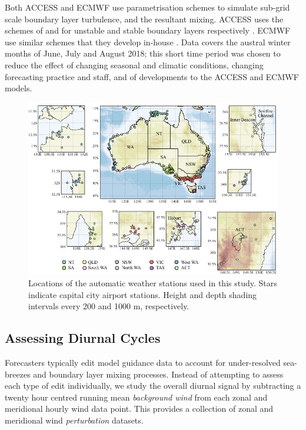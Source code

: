\documentclass{ametsoc}
\begin{document}
Both ACCESS and ECMWF use parametrisation schemes to simulate sub-grid scale boundary layer turbulence, and the resultant mixing. ACCESS uses the schemes of \citet{lock00} and \citet{louis79} for unstable and stable boundary layers respectively \citep{bom10}. ECMWF use similar schemes that they develop in-house \citep{ecmwf18}. Data covers the austral winter months of June, July and August 2018; this short time period was chosen to reduce the effect of changing seasonal and climatic conditions, changing forecasting practice and staff, and of developments to the ACCESS and ECMWF models.

\begin{figure}
\centering
\includegraphics[width=39pc]{map.pdf}
\caption{Locations of the automatic weather stations used in this study. Stars indicate capital city airport stations. Height and depth shading intervals every 200 and 1000 m, respectively.}
\label{Fig:map}
\end{figure}

\subsection{Assessing Diurnal Cycles}
Forecasters typically edit model guidance data to account for under-resolved sea-breezes and boundary layer mixing processes. Instead of attempting to assess each type of edit individually, we study the overall diurnal signal by subtracting a twenty hour centred running mean \textit{background wind} from each zonal and meridional hourly wind data point. This provides a collection of zonal and meridional wind \emph{perturbation} datasets. 
\end{document}
